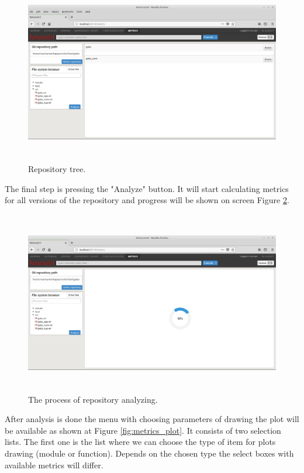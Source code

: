 \begin{figure}[h]
	\includegraphics[height=80mm]{figures/files.png}
	\caption{Repository tree.}
	\label{fig:metrics_files}
\end{figure}

The final step is pressing the "Analyze" button. It will start calculating metrics for all versions of the repository and progress will be shown on screen Figure \ref{fig:metrics_analyze}. 

\begin{figure}[h]
	\includegraphics[height=80mm]{figures/analyze.png}
	\caption{The process of repository analyzing.}
	\label{fig:metrics_analyze}
\end{figure}

After analysis is done the menu with choosing parameters of drawing the plot will be available as shown at Figure \ref{fig:metrics_plot}. It consists of two selection lists. The first one is the list where we can choose the type of item for plots drawing (module or function). Depends on the chosen type the select boxes with available metrics will differ. 

